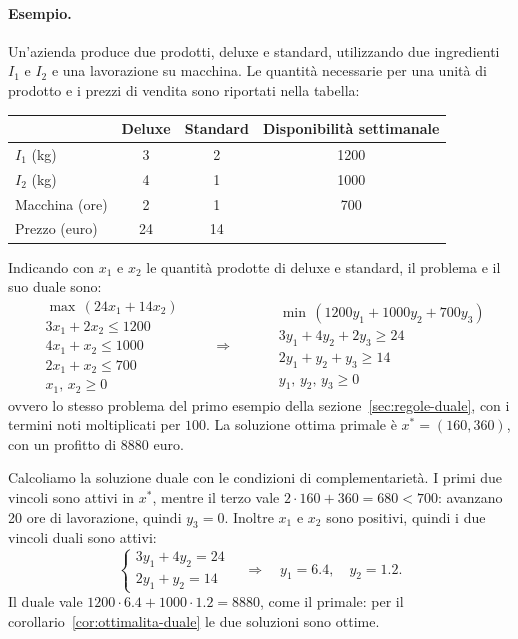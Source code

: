 \paragraph{Esempio.}
Un'azienda produce due prodotti, deluxe e standard, utilizzando due ingredienti $I_1$ e $I_2$ e una lavorazione su macchina. Le quantità necessarie per una unità di prodotto e i prezzi di vendita sono riportati nella tabella:
\begin{center}
\begin{tabular}{lccc}
\toprule
 & Deluxe & Standard & Disponibilità settimanale \\
\midrule
$I_1$ (kg) & 3 & 2 & 1200 \\
$I_2$ (kg) & 4 & 1 & 1000 \\
Macchina (ore) & 2 & 1 & 700 \\
Prezzo (euro) & 24 & 14 & \\
\bottomrule
\end{tabular}
\end{center}
Indicando con $x_1$ e $x_2$ le quantità prodotte di deluxe e standard, il problema e il suo duale sono:
\[
\begin{aligned}
&\max\, (24x_1 + 14x_2) \\
&3x_1 + 2x_2 \le 1200 \\
&4x_1 + x_2 \le 1000 \\
&2x_1 + x_2 \le 700 \\
&x_1,\, x_2 \ge 0
\end{aligned}
\qquad\Longrightarrow\qquad
\begin{aligned}
&\min\, (1200y_1 + 1000y_2 + 700y_3) \\
&3y_1 + 4y_2 + 2y_3 \ge 24 \\
&2y_1 + y_2 + y_3 \ge 14 \\
&y_1,\, y_2,\, y_3 \ge 0
\end{aligned}
\]
ovvero lo stesso problema del primo esempio della sezione~\ref{sec:regole-duale}, con i termini noti moltiplicati per $100$. La soluzione ottima primale è $x^* = (160, 360)$, con un profitto di $8880$ euro.

Calcoliamo la soluzione duale con le condizioni di complementarietà. I primi due vincoli sono attivi in $x^*$, mentre il terzo vale $2 \cdot 160 + 360 = 680 < 700$: avanzano 20 ore di lavorazione, quindi $y_3 = 0$. Inoltre $x_1$ e $x_2$ sono positivi, quindi i due vincoli duali sono attivi:
\[
\begin{cases}
3y_1 + 4y_2 = 24 \\
2y_1 + y_2 = 14
\end{cases}
\quad\Longrightarrow\quad y_1 = 6.4, \quad y_2 = 1.2.
\]
Il duale vale $1200 \cdot 6.4 + 1000 \cdot 1.2 = 8880$, come il primale: per il corollario~\ref{cor:ottimalita-duale} le due soluzioni sono ottime.

